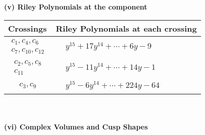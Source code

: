 \documentclass[1p]{elsarticle_modified}
\theoremstyle{definition}
\begin{document}
\newpage\renewcommand{\arraystretch}{1}
\flushleft \textbf{(v) Riley Polynomials at the component}\newline \\
\begin{tabular}{m{50pt}|m{274pt}}
Crossings & \hspace{64pt}Riley Polynomials at each crossing \\
\hline $$\begin{aligned}c_{1},c_{4},c_{6}\\c_{7},c_{10},c_{12}\end{aligned}$$&$\begin{aligned}
&y^{15}+17 y^{14}+\cdots+6 y-9
\end{aligned}$\\
\hline $$\begin{aligned}c_{2},c_{5},c_{8}\\c_{11}\end{aligned}$$&$\begin{aligned}
&y^{15}-11 y^{14}+\cdots+14 y-1
\end{aligned}$\\
\hline $$\begin{aligned}c_{3},c_{9}\end{aligned}$$&$\begin{aligned}
&y^{15}-6 y^{14}+\cdots+224 y-64
\end{aligned}$\\
\hline
\end{tabular}\\~\\
\newpage\flushleft \textbf{(vi) Complex Volumes and Cusp Shapes}
\end{document}
